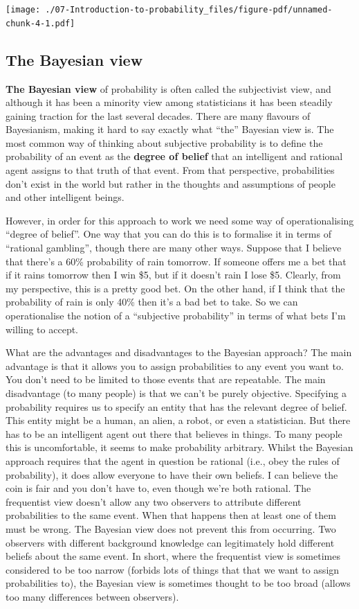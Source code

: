 \documentclass[
  letterpaper,
]{book}
\begin{document}
\texttt{[image: ./07-Introduction-to-probability\_files/figure-pdf/unnamed-chunk-4-1.pdf]}

\hypertarget{the-bayesian-view}{%
\subsection{The Bayesian view}\label{the-bayesian-view}}

\textbf{The Bayesian view} of probability is often called the
subjectivist view, and although it has been a minority view among
statisticians it has been steadily gaining traction for the last several
decades. There are many flavours of Bayesianism, making it hard to say
exactly what ``the'' Bayesian view is. The most common way of thinking
about subjective probability is to define the probability of an event as
the \textbf{degree of belief} that an intelligent and rational agent
assigns to that truth of that event. From that perspective,
probabilities don't exist in the world but rather in the thoughts and
assumptions of people and other intelligent beings.

However, in order for this approach to work we need some way of
operationalising ``degree of belief''. One way that you can do this is
to formalise it in terms of ``rational gambling'', though there are many
other ways. Suppose that I believe that there's a 60\% probability of
rain tomorrow. If someone offers me a bet that if it rains tomorrow then
I win \$5, but if it doesn't rain I lose \$5. Clearly, from my
perspective, this is a pretty good bet. On the other hand, if I think
that the probability of rain is only 40\% then it's a bad bet to take.
So we can operationalise the notion of a ``subjective probability'' in
terms of what bets I'm willing to accept.

What are the advantages and disadvantages to the Bayesian approach? The
main advantage is that it allows you to assign probabilities to any
event you want to. You don't need to be limited to those events that are
repeatable. The main disadvantage (to many people) is that we can't be
purely objective. Specifying a probability requires us to specify an
entity that has the relevant degree of belief. This entity might be a
human, an alien, a robot, or even a statistician. But there has to be an
intelligent agent out there that believes in things. To many people this
is uncomfortable, it seems to make probability arbitrary. Whilst the
Bayesian approach requires that the agent in question be rational (i.e.,
obey the rules of probability), it does allow everyone to have their own
beliefs. I can believe the coin is fair and you don't have to, even
though we're both rational. The frequentist view doesn't allow any two
observers to attribute different probabilities to the same event. When
that happens then at least one of them must be wrong. The Bayesian view
does not prevent this from occurring. Two observers with different
background knowledge can legitimately hold different beliefs about the
same event. In short, where the frequentist view is sometimes considered
to be too narrow (forbids lots of things that that we want to assign
probabilities to), the Bayesian view is sometimes thought to be too
broad (allows too many differences between observers).
\end{document}
